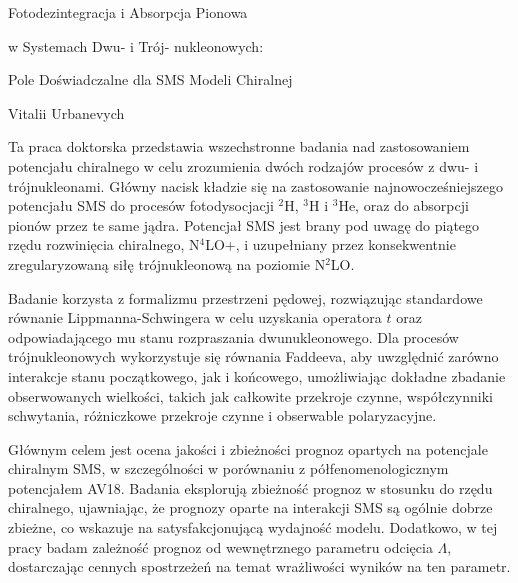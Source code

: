 \documentclass[a4paper, 14pt]{extarticle}
\begin{document}

\Large
 \begin{center}
  Fotodezintegracja i Absorpcja Pionowa

  w Systemach Dwu- i Trój- nukleonowych:

  Pole Doświadczalne dla SMS Modeli Chiralnej

\hspace{10pt}

\large
Vitalii Urbanevych \\

\hspace{10pt}


\end{center}

\hspace{10pt}

\normalsize

Ta praca doktorska przedstawia wszechstronne badania nad zastosowaniem potencja\l{}u chiralnego w celu zrozumienia dw\'och rodzaj\'ow proces\'ow z dwu- i tr\'ojnukleonami.
G\l{}\'owny nacisk k\l{}adzie si\k{e} na zastosowanie najnowocześniejszego potencja\l{}u SMS do proces\'ow fotodysocjacji $^2$H, $^3$H i $^3$He,
oraz do absorpcji pion\'ow przez te same j\k{a}dra.
Potencja\l{} SMS jest brany pod uwag\k{e} do pi\k{a}tego rz\k{e}du rozwini\k{e}cia chiralnego, N$^4$LO+, i uzupe\l{}niany przez konsekwentnie zregularyzowan\k{a} si\l{}\k{e} tr\'ojnukleonow\k{a} na poziomie N$^2$LO.

Badanie korzysta z formalizmu przestrzeni p\k{e}dowej, rozwi\k{a}zuj\k{a}c standardowe r\'ownanie Lippmanna-Schwingera w celu uzyskania operatora $t$ oraz odpowiadaj\k{a}cego mu stanu rozpraszania dwunukleonowego. Dla proces\'ow tr\'ojnukleonowych wykorzystuje si\k{e} r\'ownania Faddeeva, aby uwzgl\k{e}dni\'c zar\'owno interakcje stanu pocz\k{a}tkowego, jak i końcowego, umo\.zliwiaj\k{a}c dok\l{}adne zbadanie obserwowanych wielkości, takich jak ca\l{}kowite przekroje czynne, wsp\'o\l{}czynniki schwytania, r\'o\.zniczkowe przekroje czynne i obserwable polaryzacyjne.

G\l{}\'ownym celem jest ocena jakości i zbie\.zności prognoz opartych na potencjale chiralnym SMS, w szczeg\'olności w por\'ownaniu z p\'o\l{}fenomenologicznym potencja\l{}em AV18. Badania eksploruj\k{a} zbie\.znoś\'c prognoz w stosunku do rz\k{e}du chiralnego, ujawniaj\k{a}c, \.ze prognozy oparte na interakcji SMS s\k{a} og\'olnie dobrze zbie\.zne, co wskazuje na satysfakcjonuj\k{a}c\k{a} wydajnoś\'c modelu. Dodatkowo, w tej pracy badam zale\.znoś\'c prognoz od wewn\k{e}trznego parametru odci\k{e}cia $\Lambda$, dostarczaj\k{a}c cennych spostrze\.zeń na temat wra\.zliwości wynik\'ow na ten parametr.
\end{document}
